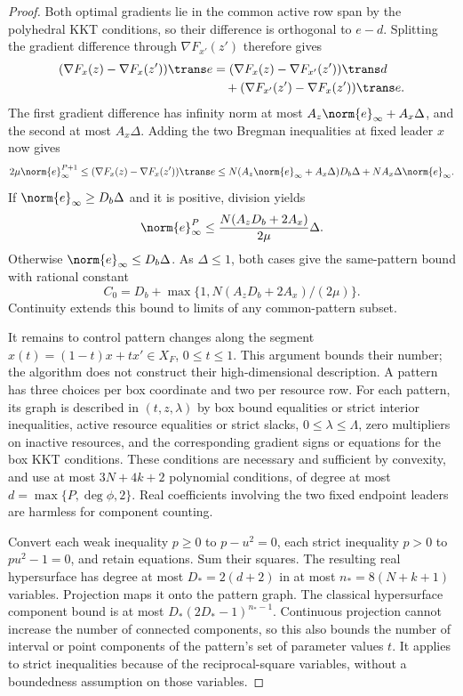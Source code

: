 \begin{proof}
Both optimal gradients lie in the common active row span by the
polyhedral KKT conditions, so their difference is orthogonal to $e-d$.
Splitting the gradient difference through $\nabla F_{x'}(z')$ therefore gives
\[
 \begin{aligned}
 (\nabla F_x(z)-\nabla F_x(z'))\trans e
 &= (\nabla F_x(z)-\nabla F_{x'}(z'))\trans d\\
 &\quad +(\nabla F_{x'}(z')-\nabla F_x(z'))\trans e.
 \end{aligned}
\]
The first gradient difference has infinity norm at most
$A_z\norm{e}_\infty+A_x\Delta$, and the second at most $A_x\Delta$.
Adding the two Bregman inequalities at fixed leader $x$ now gives
\[
 2\mu\norm{e}_\infty^{P+1}
 \le(\nabla F_x(z)-\nabla F_x(z'))\trans e
 \le N(A_z\norm{e}_\infty+A_x\Delta)D_b\Delta
                                      +NA_x\Delta\norm{e}_\infty.
\]
If $\norm{e}_\infty\ge D_b\Delta$ and it is positive, division yields
\[
 \norm{e}_\infty^P\le\frac{N(A_zD_b+2A_x)}{2\mu}\Delta.
\]
Otherwise $\norm{e}_\infty\le D_b\Delta$. As $\Delta\le1$, both
cases give the same-pattern bound with rational constant
\[
 C_0=D_b+\max\{1,N(A_zD_b+2A_x)/(2\mu)\}.
\]
Continuity extends this bound to limits of any common-pattern subset.

It remains to control pattern changes along the segment
$x(t)=(1-t)x+tx'\in X_F$, $0\le t\le1$. This argument bounds
their number; the algorithm does not construct their high-dimensional
description. A pattern has three choices per box coordinate and two per
resource row. For each pattern, its graph is described in $(t,z,\lambda)$
by box bound equalities or strict interior inequalities, active resource
equalities or strict slacks, $0\le\lambda\le\Lambda$, zero multipliers
on inactive resources, and the corresponding gradient signs or equations
for the box KKT conditions. These conditions are necessary and sufficient
by convexity, and use at most $3N+4k+2$ polynomial conditions, of degree
at most $d=\max\{P,\deg\phi,2\}$. Real coefficients involving the two
fixed endpoint leaders are harmless for component counting.

Convert each weak inequality $p\ge0$ to $p-u^2=0$, each strict
inequality $p>0$ to $pu^2-1=0$, and retain equations. Sum their squares.
The resulting real hypersurface has degree at most $D_*=2(d+2)$ in
at most $n_*=8(N+k+1)$ variables. Projection maps it onto the pattern
graph. The classical hypersurface component bound
\cite{Milnor1964} is at most $D_*(2D_*-1)^{n_*-1}$.
Continuous projection cannot increase the number of connected components,
so this also bounds the number of interval or point components of the
pattern's set of parameter values $t$. It applies to strict inequalities
because of the reciprocal-square variables, without a boundedness
assumption on those variables.


\end{proof}

